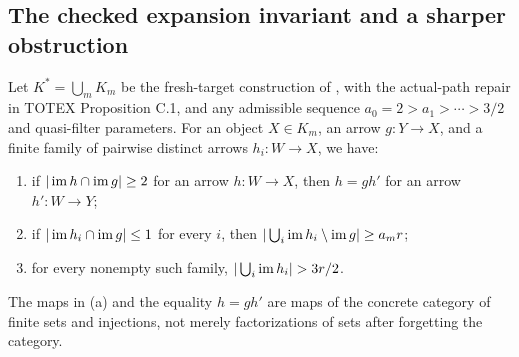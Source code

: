 \subsection{The checked expansion invariant and a sharper obstruction}

\begin{proposition}
\label{C:akr-invariant}
Let $K^*=\bigcup_mK_m$ be the fresh-target construction of
\citet[Construction C.1]{AdamekKoubekReiterman1981}, with the
actual-path repair in TOTEX Proposition C.1, and any admissible
sequence $a_0=2>a_1>\cdots>3/2$ and quasi-filter parameters.
For an object $X\in K_m$, an arrow $g:Y\to X$, and a finite
family of pairwise distinct arrows $h_i:W\to X$, we have:
\begin{enumerate}[label=(\alph*)]
\item if $|\operatorname{im} h\cap\operatorname{im} g|\geq2$ for an arrow $h:W\to X$,
then $h=gh'$ for an arrow $h':W\to Y$;
\item if $|\operatorname{im} h_i\cap\operatorname{im} g|\leq1$ for every $i$, then
$|\bigcup_i\operatorname{im} h_i\setminus\operatorname{im} g|\geq a_m r$;
\item for every nonempty such family,
$|\bigcup_i\im h_i|>3r/2$.
\end{enumerate}
The maps in (a) and the equality $h=gh'$ are maps of the
concrete category of finite sets and injections, not merely
factorizations of sets after forgetting the category.
\end{proposition}
